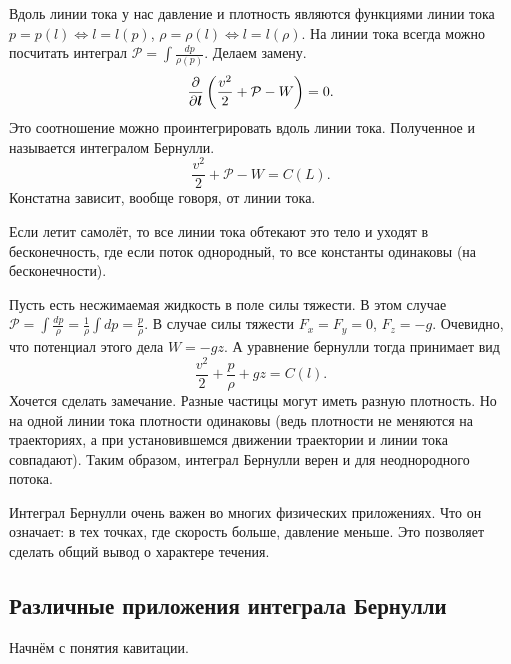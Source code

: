 Вдоль линии тока у нас давление и плотность являются функциями линии тока $p = p(l)\iff l = l(p)$, $\rho=\rho(l)\iff l = l(\rho)$. На линии тока всегда можно посчитать интеграл $\mathcal P=\int\frac{dp}{\rho(p)}$. Делаем замену.
\[\frac{\partial }{\partial \boldsymbol{l}}\left(\frac{v^2}2+\mathcal P-W\right)=0.\]
Это соотношение можно проинтегрировать вдоль линии тока. Полученное и называется интегралом Бернулли.
\[\frac{v^2}2+\mathcal P-W=C(L).\]
Констатна зависит, вообще говоря, от линии тока.

Если летит самолёт, то все линии тока обтекают это тело и уходят в бесконечность, где если поток однородный, то все константы одинаковы (на бесконечности).

Пусть есть несжимаемая жидкость в поле силы тяжести. В этом случае $\mathcal P=\int\frac{dp}\rho=\frac1\rho\int dp=\frac p\rho$. В случае силы тяжести $F_x=F_y=0$, $F_z=-g$. Очевидно, что потенциал этого дела $W=-gz$.
А уравнение бернулли тогда принимает вид
\[
  \frac{v^2}2 + \frac p\rho + gz = C(l).
\]
Хочется сделать замечание. Разные частицы могут иметь разную плотность. Но на одной линии тока плотности одинаковы (ведь плотности не меняются на траекториях, а при установившемся движении траектории и линии тока совпадают). Таким образом, интеграл Бернулли верен и для неоднородного потока.

Интеграл Бернулли очень важен во многих физических приложениях. Что он означает: в тех точках, где скорость больше, давление меньше. Это позволяет сделать общий вывод о характере течения.

\subsection{Различные приложения интеграла Бернулли}
Начнём с понятия кавитации.

